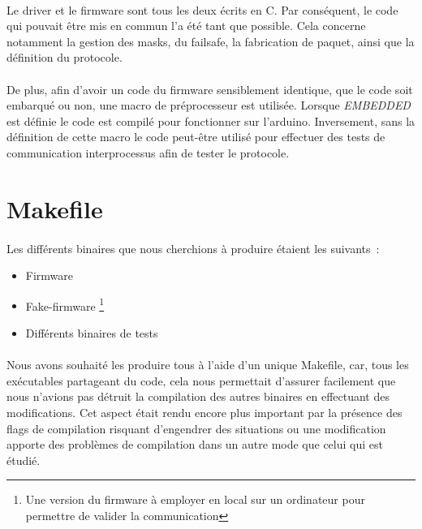\paragraph{}
Le driver et le firmware sont tous les deux écrits en C. Par conséquent, le
code qui pouvait être mis en commun l'a été tant que possible. Cela concerne
notamment la gestion des masks, du failsafe, la fabrication de paquet, ainsi
que la définition du protocole.

\paragraph{}
De plus, afin d'avoir un code du firmware sensiblement identique, que le code
soit embarqué ou non, une macro de préprocesseur est utilisée. Lorsque
\emph{EMBEDDED} est définie le code est compilé pour fonctionner sur
l'arduino. Inversement, sans la définition de cette macro le code peut-être
utilisé pour effectuer des tests de communication interprocessus afin de
tester le protocole.


\section{Makefile}
\paragraph{}
Les différents binaires que nous cherchions à produire étaient les suivants~:
\begin{itemize}
\item Firmware
\item Fake-firmware
      \footnote{Une version du firmware à employer en local sur un ordinateur
                pour permettre de valider la communication}
\item Différents binaires de tests
\end{itemize}

\paragraph{}
Nous avons souhaité les produire tous à l'aide d'un unique Makefile, car, tous
les exécutables partageant du code, cela nous permettait d'assurer facilement
que nous n'avions pas détruit la compilation des autres binaires en effectuant
des modifications. Cet aspect était rendu encore plus important par la présence
des flags de compilation risquant d'engendrer des situations ou une modification
apporte des problèmes de compilation dans un autre mode que celui qui est
étudié.

